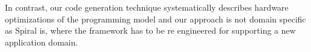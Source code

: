 In contrast, our code generation technique systematically describes hardware optimizations of the \OpenCL programming model and our approach is not domain specific as Spiral is, where the framework has to be re engineered for supporting a new application domain.




%
%
%
%

